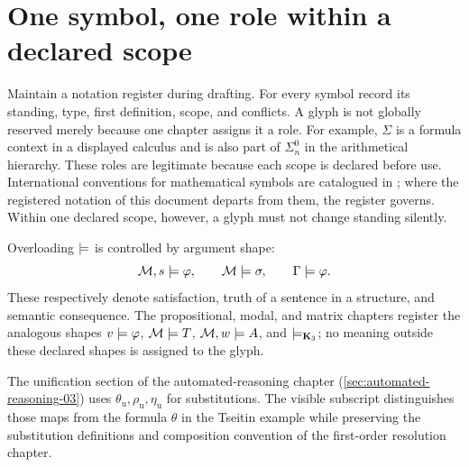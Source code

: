 \section{One symbol, one role within a declared scope}
\label{sec:latex-style-02}

Maintain a notation register during drafting.  For every symbol record its
standing, type, first definition, scope, and conflicts.  A glyph is not globally
reserved merely because one chapter assigns it a role.  For example,
\(\Sigma\) is a formula context in a displayed calculus and is also part of
\(\Sigma^0_n\) in the arithmetical hierarchy.  These roles are legitimate
because each scope is declared before use.  International conventions for
mathematical symbols are catalogued in \cite{ISO80000}; where the
registered notation of this document departs from them, the register
governs.
Within one declared scope, however, a glyph must not change standing silently.

Overloading \(\models\) is controlled by argument shape:
\[
  \mathcal M,s\models\varphi,
  \qquad
  \mathcal M\models\sigma,
  \qquad
  \Gamma\models\varphi.
\]
These respectively denote satisfaction, truth of a sentence in a structure,
and semantic consequence.  The propositional, modal, and matrix chapters
register the analogous shapes \(v\models\varphi\),
\(\mathcal M\models T\), \(\mathcal M,w\models A\), and
\(\models_{\mathbf K_3}\); no meaning outside these declared shapes is
assigned to the glyph.

The unification section of the automated-reasoning chapter
(\cref{sec:automated-reasoning-03}) uses
\(\theta_{\mathrm u},\rho_{\mathrm u},\eta_{\mathrm u}\) for substitutions.
The visible subscript distinguishes those maps from the formula \(\theta\) in
the Tseitin example while preserving the substitution definitions and
composition convention of the first-order resolution chapter.

